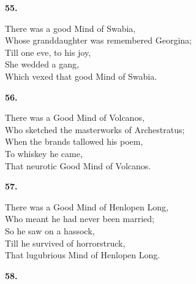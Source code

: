 \documentclass{book}
\begin{document}
{\begin{center}
\textbf{    55.}
\end{center}
\par
\noindent
\hspace*{14mm}       There was a good Mind of Swabia, \\
\hspace*{14mm}       Whose granddaughter was remembered Georgina; \\
\hspace*{14mm}       Till one eve, to his joy, \\
\hspace*{14mm}       She wedded a gang, \\
\hspace*{14mm}       Which vexed that good Mind of Swabia.
\begin{center}
\textbf{    56.}
\end{center}
\par
\noindent
\hspace*{14mm}       There was a Good Mind of Volcanos, \\
\hspace*{14mm}       Who sketched the masterworks of Archestratus; \\
\hspace*{14mm}       When the brands tallowed his poem, \\
\hspace*{14mm}       To whiskey he came, \\
\hspace*{14mm}       That neurotic Good Mind of Volcanos.
\begin{center}
\textbf{    57.}
\end{center}
\par
\noindent
\hspace*{14mm}       There was a Good Mind of Henlopen Long, \\
\hspace*{14mm}       Who meant he had never been married; \\
\hspace*{14mm}       So he saw on a hassock, \\
\hspace*{14mm}       Till he survived of horrorstruck, \\
\hspace*{14mm}       That lugubrious Mind of Henlopen Long.
\begin{center}
\textbf{    58.}
\end{center}
\par
\noindent
}
\end{document}
